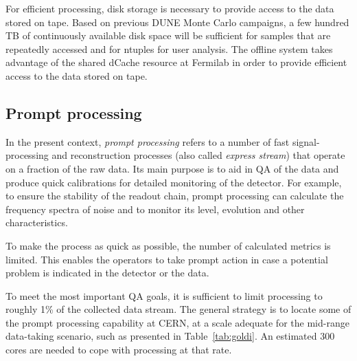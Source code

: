For efficient processing, disk storage is necessary to provide access to the data stored on tape.
Based on %
previous DUNE Monte Carlo campaigns, %
a few hundred TB of continuously available disk space will be sufficient for samples that are repeatedly
accessed and for ntuples for user analysis.  The offline system takes advantage of the shared dCache resource 
at Fermilab in order to provide efficient access to the data stored on tape. 


\subsection{Prompt processing}
\label{sec:prompt_processing}

In the present context, \textit{prompt processing} refers to a number of fast signal-processing and reconstruction processes
(also called \textit{express stream}) that %
operate on a fraction of the raw data. Its main purpose is to aid in QA of the data
and produce quick calibrations %
for detailed monitoring of the detector. For example, to ensure the stability of the readout chain, prompt processing can 
calculate the frequency spectra of noise and to monitor its level, evolution and other characteristics.

To make the process as quick as possible, the number of calculated metrics is limited. This enables
the operators to take prompt action in case a potential problem is indicated in the detector or the data.

To meet the most important QA goals, it is sufficient to limit processing to roughly 1\% of the collected data stream. 
The general strategy is to locate some of the prompt processing capability at CERN, at a scale adequate for the mid-range
data-taking scenario, such as presented in Table~\ref{tab:goldi}. An estimated 300 cores
are needed to cope with processing at that rate.


